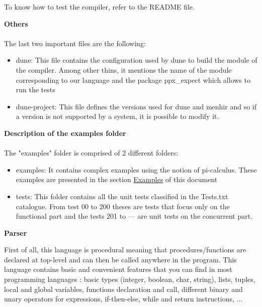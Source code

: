 \documentclass[11pt]{report}
\begin{document}
To know how to test the compiler, refer to the README file.

{}
\tabto{0cm} {\LARGE \textbf{Others}}
\\ \\
The last two important files are the following:

\begin{itemize}
\item dune: This file contains the configuration used by dune to build the module of the compiler. Among other thins, it mentions the name of the module corresponding to our language and the package ppx\_expect which allows to run the tests 
\item dune-project: This file defines the versions used for dune and menhir and so if a version is not supported by a system, it is possible to modify it.
\end{itemize}

{} 
\tabto{0cm} {\LARGE \textbf{Description of the examples folder}}
\\ \\

\tabto{1cm} The "examples" folder is comprised of 2 different folders:
\begin{itemize}
    \item examples: It contains complex examples using the notion of pi-calculus. These examples are presented in the section \hyperref[Examples]{Examples} of this document
    \item tests: This folder contains all the unit tests classified in the Tests.txt catalogue. From test 00 to 200 theses are tests that focus only on the functional part and the tests 201 to --- are unit tests on the concurrent part.
\end{itemize}

\newpage
{}
{}
\centerline{\textbf{\Huge Parser}}
\vspace*{15pt}
{}
\vspace*{3pt}
\vspace*{20pt}
\tabto{1cm}First of all, this language is procedural meaning that procedures/functions are declared at top-level and can then be called anywhere in the program. This language contains basic and convenient features that you can find in most programming languages : basic types (integer, boolean, char, string), lists, 
tuples, local and global variables, functions declaration and call, different binary and unary operators for expressions, if-then-else, while and return instructions, ... \\ 
\end{document}
